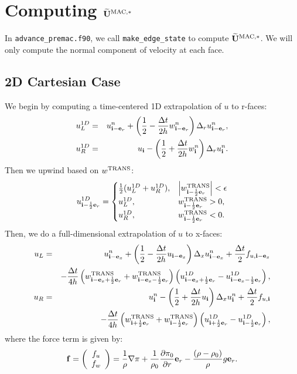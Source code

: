 \documentclass[11pt]{article}
\def\half  {\frac{1}{2}}
\def\dt    {\Delta t}
\def\mac   {\rm MAC}
\def\trans {\rm TRANS}
\def\eb    {{\bf e}}
\def\fb    {{\bf f}}
\def\ib    {{\bf i}}
\def\Ubt   {\widetilde{\bf U}}
\begin{document}
\section{Computing $\Ubt^{\mac,*}$}
In {\tt advance\_premac.f90}, we call {\tt make\_edge\_state} to compute $\Ubt^{\mac,*}$.  We will only compute the normal component of velocity at each face.
\subsection{2D Cartesian Case}
We begin by computing a time-centered 1D extrapolation of $u$ to r-faces:
\begin{eqnarray}
u_L^{1D} &=& u_{\ib-\eb_r}^n + \left(\half - \frac{\dt}{2h}w_{\ib-\eb_r}^n\right)\Delta_r u_{\ib-\eb_r}^n, \\
u_R^{1D} &=& u_{\ib} - \left(\half + \frac{\dt}{2h}w_{\ib}^n\right)\Delta_r u_{\ib}^n.
\end{eqnarray}
Then we upwind based on $w^{\trans}$:
\begin{equation}
u_{\ib-\half\eb_r}^{1D} =
\begin{cases}
\half(u_L^{1D} + u_R^{1D}), & \left|w^{\trans}_{\ib-\half\eb_r}\right| < \epsilon \\
u_L^{1D}, & w^{\trans}_{\ib-\half\eb_r} > 0, \\
u_R^{1D}, & w^{\trans}_{\ib-\half\eb_r} < 0. \\
\end{cases}
\end{equation}
Then, we do a full-dimensional extrapolation of $u$ to x-faces:
\begin{eqnarray}
u_L &=& u_{\ib-\eb_x}^n + \left(\half - \frac{\dt}{2h}u_{\ib-\eb_x}\right)\Delta_x u_{\ib-\eb_x}^n + \frac{\dt}{2}f_{u,\ib-\eb_x} \nonumber \\
&& - \frac{\dt}{4h}\left(w_{\ib-\eb_x+\half\eb_r}^{\trans}+w_{\ib-\eb_x-\half\eb_r}^{\trans}\right)\left(u_{\ib-\eb_x+\half\eb_r}^{1D} - u_{\ib-\eb_x-\half\eb_r}^{1D}\right), \\
u_R &=& u_{\ib}^n - \left(\half + \frac{\dt}{2h}u_{\ib}\right)\Delta_x u_{\ib}^n + \frac{\dt}{2}f_{u,\ib} \nonumber \\
&& - \frac{\dt}{4h}\left(w_{\ib+\half\eb_r}^{\trans}+w_{\ib-\half\eb_r}^{\trans}\right)\left(u_{\ib+\half\eb_r}^{1D} - u_{\ib-\half\eb_r}^{1D}\right),
\end{eqnarray}
where the force term is given by:
\begin{equation}
\fb =
\left(\begin{array}{c}
f_u \\
f_w \\
\end{array}\right)
= \frac{1}{\rho}\nabla\pi + \frac{1}{\rho_0}\frac{\partial\pi_0}{\partial r}\eb_r - \frac{(\rho-\rho_0)}{\rho}g\eb_r.\label{Force Term}
\end{equation}
\end{document}
